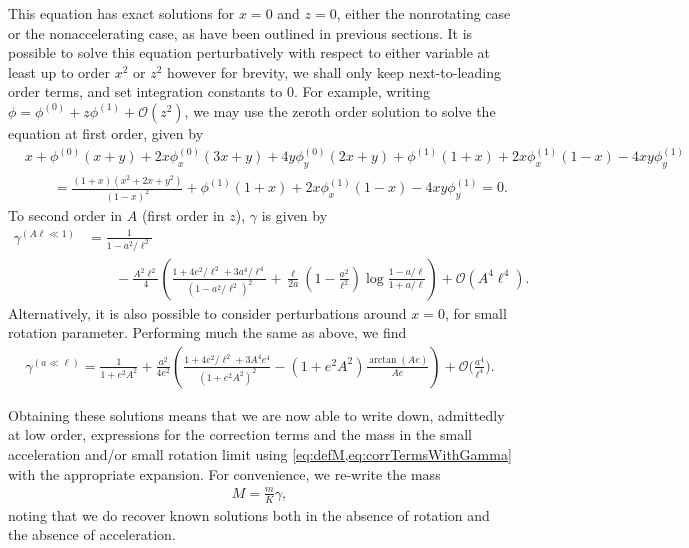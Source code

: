 \documentclass[
twoside,
openright,
frontopenright,
]{dmathesis}
\newcommand{\nn}{\nonumber}
\begin{document}
This equation has exact solutions for $x=0$ and $z=0$, either the nonrotating
case or the nonaccelerating case, as have been outlined in previous
sections. It is possible to solve this equation perturbatively with respect to
either variable at least up to order $x^2$ or $z^2$ however for brevity, we
shall only keep next-to-leading order terms, and set integration constants to
$0$. For example, writing $\phi = \phi^{(0)}+z\phi^{(1)}+\mathcal{O}(z^2)$, we
may use the zeroth order solution to solve the equation at first order, given by
\begin{align}
&x+\phi^{(0)}(x+y)+2x\phi^{(0)}_{x}(3x+y)+4y\phi^{(0)}_{y}(2x+y)+\phi^{(1)}(1+x)+2x\phi^{(1)}_{x}(1-x)-4xy\phi^{(1)}_{y}\nn\\
&\qquad= \frac{(1+x)(x^2+2x+y^2)}{(1-x)^2}+\phi^{(1)}(1+x)+2x\phi^{(1)}_{x}(1-x)-4xy\phi^{(1)}_{y} = 0.
\end{align}
To second order in $A$ (first order in $z$), $\gamma$ is given by
\begin{align}
  \gamma^{(A\ell\ll 1)} &= \frac{1}{1-a^2/\ell^2}\nn\\
     &\qquad -\frac{A^2\ell^2}{4} \left(\frac{1+4e^2/\ell^2+3
       a^4/\ell^4}{\left(1-a^2/\ell^2\right)^2} +\frac{\ell}{2a}
       \left(1-\frac{a^2}{\ell^2}\right) \log\frac{1-a/\ell}{1+a/\ell}\right)
       +\mathcal{O}(A^4\ell^4). 
\label{eq:gamsmallA}
\end{align}
Alternatively, it is also possible to consider perturbations around $x=0$, for
small rotation parameter. Performing much the same as above, we find
\begin{align}\label{eq:gamsmalla}
\gamma^{(a\ll \ell)} = \frac{1}{1+e^2A^2}+\frac{a^2}{4e^2}\left(\frac{1+4e^2/\ell^2+3 A^4 e^4}{\left(1+e^2A^2\right)^2}-\left(1+e^2A^2\right) \frac{\arctan(A e)}{A e }\right)+\mathcal{O}\Big(\frac{a^4}{\ell^4}\Big).
\end{align}

Obtaining these solutions means that we are now able to write down, admittedly
at low order, expressions for the correction terms and the mass in the small
acceleration and/or small rotation limit using
\cref{eq:defM,eq:corrTermsWithGamma} with the appropriate expansion. For
convenience, we re-write the mass
\begin{align}
M=\frac{m}{K}\gamma,
\end{align}
noting that we do recover known solutions both in the absence of rotation and
the absence of acceleration.
\end{document}
